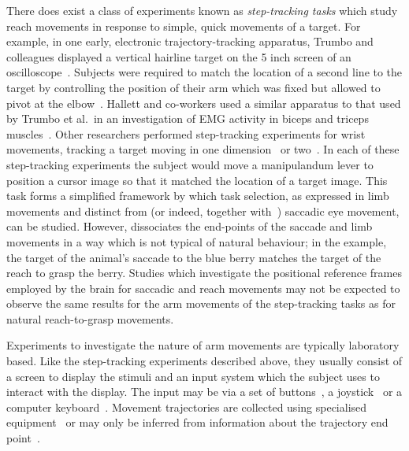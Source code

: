 \documentclass[10pt,letterpaper]{article}
\begin{document}
There does exist a class of experiments known as \emph{step-tracking
  tasks} which study reach movements in response to simple, quick
movements of a target. For example, in one early, electronic
trajectory-tracking apparatus, Trumbo and colleagues displayed a
vertical hairline target on the 5 inch screen of an
oscilloscope~\cite{trumbo_versatile_1963}. Subjects were required to
match the location of a second line to the target by controlling the
position of their arm which was fixed but allowed to pivot at the
elbow~\cite{trumbo_motor_1968}. Hallett and co-workers used a similar
apparatus to that used by Trumbo et al.~in an investigation of EMG
activity in biceps and triceps muscles~\cite{hallett_emg_1975}. Other
researchers performed step-tracking experiments for wrist movements,
tracking a target moving in one
dimension~\cite{waters_influence_1981,hoffman_step-tracking_1986} or
two~\cite{haruno_optimal_2005}. In each of these step-tracking
experiments the subject would move a manipulandum lever to position a
cursor image so that it matched the location of a target image. This
task forms a simplified framework by which task selection, as
expressed in limb movements and distinct from (or indeed, together
with~\cite{trumbo_motor_1968}) saccadic eye movement, can be
studied. However, dissociates the end-points of the saccade and
limb movements in a way which is not typical of natural behaviour; in
the example, the target of the animal's saccade to the blue berry
matches the target of the reach to grasp the berry. Studies which
investigate the positional reference frames employed by the brain for
saccadic and reach movements may not be expected to observe the same
results for the arm movements of the step-tracking tasks as for
natural reach-to-grasp movements.

Experiments to investigate the nature of arm movements are typically
laboratory based. Like the step-tracking experiments described above,
they usually consist of a screen to display the stimuli and an input
system which the subject uses to interact with the display. The input
may be via a set of
buttons~\cite{tipper_selective_1992,waszak_intention-based_2005}, a
joystick~\cite{pratt_action-centered_1994} or a computer
keyboard~\cite{elsner_effect_2001}. Movement trajectories are
collected using specialised
equipment~\cite{song_target_2008,jax_hand_2007} or may only be
inferred from information about the trajectory end
point~\cite{pratt_action-centered_1994}.
\end{document}
